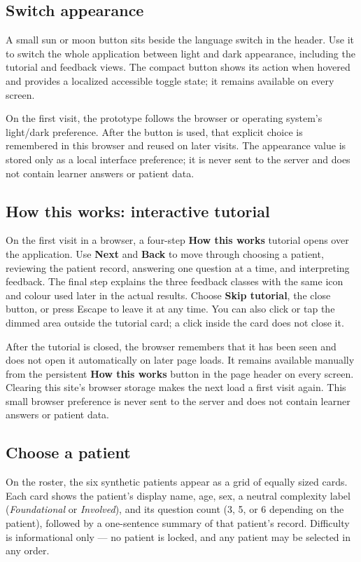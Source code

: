 \documentclass[11pt,a4paper]{article}
\begin{document}
\subsection{Switch appearance}

A small sun or moon button sits beside the language switch in the header.
Use it to switch the whole application between light and dark appearance,
including the tutorial and feedback views. The compact button shows its
action when hovered and provides a localized accessible toggle state; it
remains available on every screen.

On the first visit, the prototype follows the browser or operating system's
light/dark preference. After the button is used, that explicit choice is
remembered in this browser and reused on later visits. The appearance value
is stored only as a local interface preference; it is never sent to the
server and does not contain learner answers or patient data.

\subsection{How this works: interactive tutorial}

On the first visit in a browser, a four-step \textbf{How this works}
tutorial opens over the application. Use \textbf{Next} and \textbf{Back}
to move through choosing a patient, reviewing the patient record, answering
one question at a time, and interpreting feedback. The final step explains
the three feedback classes with the same icon and colour used later in the
actual results. Choose \textbf{Skip tutorial}, the close button, or press
Escape to leave it at any time. You can also click or tap the dimmed area
outside the tutorial card; a click inside the card does not close it.

After the tutorial is closed, the browser remembers that it has been seen
and does not open it automatically on later page loads. It remains available
manually from the persistent \textbf{How this works} button in the page
header on every screen. Clearing this site's browser storage makes the next
load a first visit again. This small browser preference is never sent to the
server and does not contain learner answers or patient data.

\subsection{Choose a patient}

On the roster, the six synthetic patients appear as a grid of
equally sized cards. Each card shows the patient's display name, age, sex,
a neutral complexity label (\textit{Foundational} or \textit{Involved}),
and its question count (3, 5, or 6 depending on the patient), followed by a
one-sentence summary of that patient's record. Difficulty is informational
only --- no patient is locked, and any patient may be selected in any
order.
\end{document}
